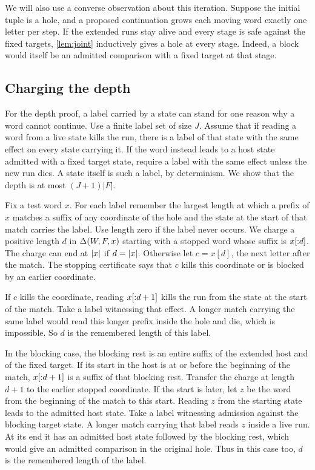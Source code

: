 We will also use a converse observation about this iteration.
Suppose the initial tuple is a hole, and a proposed continuation grows
each moving word exactly one letter per step. If the extended runs
stay alive and every stage is safe against the fixed targets,
\cref{lem:joint} inductively gives a hole at every stage. Indeed,
a block would itself be an admitted comparison with a fixed target
at that stage.

\subsection{Charging the depth}
\label{app:charging}

For the depth proof, a label carried by a state can stand for one
reason why a word cannot continue. Use a finite label set of size $J$.
Assume that if reading a word from a live state kills the run, there
is a label of that state with the same effect on every state carrying
it. If the word instead leads to a host state admitted with a fixed
target state, require a label with the same effect unless the new
run dies. A state itself is such a label, by determinism. We show
that the depth is at most $(J+1)|F|$.

Fix a test word $x$. For each label remember the largest length
at which a prefix of $x$ matches a suffix of any coordinate of
the hole and the state at the start of that match carries the label.
Use length zero if the label never occurs. We charge a positive
length $d$ in $\Delta(W,F,x)$ starting with a stopped word whose
suffix is $x[{:}d]$. The charge can end at $\lvert x\rvert$ if $d=\lvert x\rvert$.
Otherwise let $c=x[d]$, the next letter after the match. The stopping
certificate says that $c$ kills this coordinate or is blocked by
an earlier coordinate.

If $c$ kills the coordinate, reading $x[{:}d+1]$ kills the run
from the state at the start of the match. Take a label witnessing
that effect. A longer match carrying the same label would read this
longer prefix inside the hole and die, which is impossible. So $d$
is the remembered length of this label.

In the blocking case, the blocking rest is an entire suffix of the
extended host and of the fixed target. If its start in the host is
at or before the beginning of the match, $x[{:}d+1]$ is a suffix
of that blocking rest. Transfer the charge at length $d+1$ to the
earlier stopped coordinate. If the start is later, let $z$ be the
word from the beginning of the match to this start. Reading $z$ from
the starting state leads to the admitted host state. Take a label
witnessing admission against the blocking target state. A longer
match carrying that label reads $z$ inside a live run. At its end it
has an admitted host state followed by the blocking rest, which
would give an admitted comparison in the original hole. Thus in
this case too, $d$ is the remembered length of the label.

